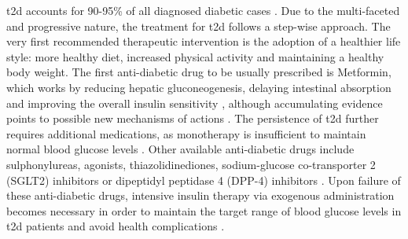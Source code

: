 \par \gls{t2d} accounts for 90-95\% of all diagnosed diabetic cases \textbf{\cite{home_idf_nodate,banday_pathophysiology_2020,elsayed_2_2022}}. Due to the multi-faceted and progressive nature, the treatment for \gls{t2d} follows a step-wise approach. The very first recommended therapeutic intervention is the adoption of a healthier life style: more healthy diet, increased physical activity and maintaining a healthy body weight. The first anti-diabetic drug to be usually prescribed is Metformin, which works by reducing hepatic gluconeogenesis, delaying intestinal absorption and improving the overall insulin sensitivity \textbf{\cite{kaneto_multifaceted_2021}}, although accumulating evidence points to possible new mechanisms of actions \textbf{\cite{foretz_metformin_2023}}. The persistence of \gls{t2d} further requires additional medications, as monotherapy is insufficient to maintain normal blood glucose levels \textbf{\cite{home_idf_nodate,nathan_medical_2009}}. Other available anti-diabetic drugs include sulphonylureas,  agonists, thiazolidinediones, sodium-glucose co-transporter 2 (SGLT2) inhibitors or dipeptidyl peptidase 4 (DPP-4) inhibitors \textbf{\cite{home_idf_nodate,nathan_medical_2009,american_diabetes_association_8_2017}}. Upon failure of these anti-diabetic drugs, intensive insulin therapy via exogenous administration becomes necessary in order to maintain the target range of blood glucose levels in \gls{t2d} patients and avoid health complications \textbf{\cite{home_idf_nodate}}.



